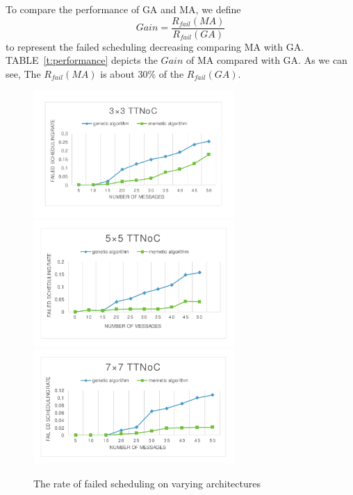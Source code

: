 \documentclass[journal]{IEEEtran}
\theoremstyle{remark}
\begin{document}
To compare the performance of GA and MA,
 we define
\begin{equation}
	Gain=\frac{R_{fail}(MA)}{R_{fail}(GA)}
\end{equation}
to represent the failed scheduling decreasing comparing MA with GA.
TABLE~\ref{t:performance} depicts the $Gain$ of MA compared with GA.
As we can see, The $R_{fail}(MA)$ is about 30\% of the $R_{fail}(GA)$.

\begin{figure}[!t]
	\centering
	\includegraphics[width=3in]{picture/33TTNOC}
		\includegraphics[width=3in]{picture/55TTNOC}
			\includegraphics[width=3in]{picture/77TTNOC}
	\caption{The rate of failed scheduling on varying architectures}
	\label{f:fail}
\end{figure}
\end{document}
